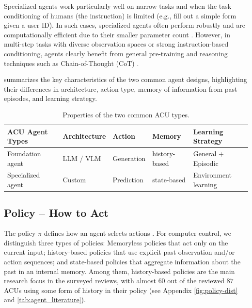 Specialized agents work particularly well on narrow tasks and when the task conditioning of humans (the instruction) is limited (e.g., fill out a simple form given a user ID). In such cases, specialized agents often perform robustly and are computationally efficient due to their smaller parameter count .
However, in multi-step tasks with diverse observation spaces or strong instruction-based conditioning, agents clearly benefit from general pre-training and reasoning techniques such as Chain-of-Thought (CoT) . 

 summarizes the key characteristics of the two common agent designs, highlighting their differences in architecture, action type, memory of information from past episodes, and learning strategy.

\begin{table}
    \caption{Properties of the two common ACU types.}
    \label{table:two-main-agents}
    \begin{tabular}{lllll}
    \toprule
   \textbf{ACU Agent Types } & \textbf{Architecture}   & \textbf{Action}  & \textbf{Memory}  & \textbf{Learning Strategy} \\ 
    \midrule
    Foundation agent & LLM / VLM               & Generation       & history-based  & General + Episodic \\
    Specialized agent  & Custom                  & Prediction       & state-based    & Environment learning  \\ 
    \bottomrule
    \end{tabular}
\end{table}

\subsection{Policy -- How to Act}\label{sec:agent_policy}
The policy $\pi$ defines how an agent selects actions \citep[Chapter~1.3]{sutton_reinforcement_2018}. For computer control, we distinguish three types of policies: Memoryless policies that act only on the current input; history-based policies that use explicit past observation and/or action sequences; and state-based policies that aggregate information about the past in an internal memory. 
Among them, history-based policies are the main research focus in the surveyed reviews, with almost $60$ out of the reviewed $87$ ACUs using some form of history in their policy (see Appendix \cref{fig:policy-dist} and \cref{tab:agent_literature}).

